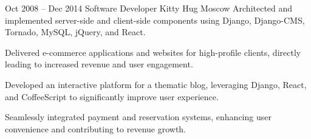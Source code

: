 \cventry
{Oct 2008 – Dec 2014}
{Software Developer}
{Kitty Hug}
{Moscow}
{}
{Architected and implemented server-side and client-side components using Django, Django-CMS, Tornado, MySQL, jQuery, and React.}

\cvlistitem
{Delivered e-commerce applications and websites for high-profile clients, directly leading to increased revenue and user engagement.}

\cvlistitem
{Developed an interactive platform for a thematic blog, leveraging Django, React, and CoffeeScript to significantly improve user experience.}

\cvlistitem
{Seamlessly integrated payment and reservation systems, enhancing user convenience and contributing to revenue growth.}

